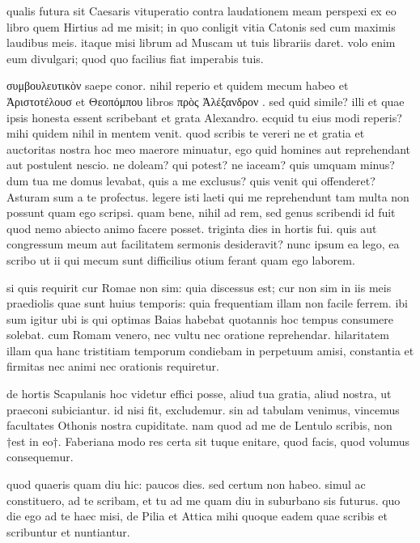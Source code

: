 


 qualis futura sit Caesaris vituperatio contra laudationem meam perspexi ex eo libro quem Hirtius ad me misit; in quo conligit vitia Catonis sed cum maximis laudibus meis. itaque misi librum ad Muscam ut tuis librariis daret. volo enim eum divulgari; quod quo facilius fiat imperabis tuis.

 συμβουλευτικὸν saepe conor. nihil reperio et quidem mecum habeo et Ἀριστοτέλουσ et Θεοπόμπου libros πρὸς Ἀλέξανδρον . sed quid simile? illi et quae ipsis honesta essent scribebant et grata Alexandro. ecquid tu eius modi reperis? mihi quidem nihil in mentem venit. quod scribis te vereri ne et gratia et auctoritas nostra hoc meo maerore minuatur, ego quid homines aut reprehendant aut postulent nescio. ne doleam? qui potest? ne iaceam? quis umquam minus? dum tua me domus levabat, quis a me exclusus? quis venit qui offenderet? Asturam sum a te profectus. legere isti laeti qui me reprehendunt tam multa non possunt quam ego scripsi. quam bene, nihil ad rem, sed genus scribendi id fuit quod nemo abiecto animo facere posset. triginta dies in hortis fui. quis aut congressum meum aut facilitatem sermonis desideravit? nunc ipsum ea lego, ea scribo ut ii qui mecum sunt difficilius otium ferant quam ego laborem.

 si quis requirit cur Romae non sim: quia discessus est; cur non sim in iis meis praediolis quae sunt huius temporis: quia frequentiam illam non facile ferrem. ibi sum igitur ubi is qui optimas Baias habebat quotannis hoc tempus consumere solebat. cum Romam venero, nec vultu nec oratione reprehendar. hilaritatem illam qua hanc tristitiam temporum condiebam in perpetuum amisi, constantia et firmitas nec animi nec orationis requiretur.

 de hortis Scapulanis hoc videtur effici posse, aliud tua gratia, aliud nostra, ut praeconi subiciantur. id nisi fit, excludemur. sin ad tabulam venimus, vincemus facultates Othonis nostra cupiditate. nam quod ad me de Lentulo scribis, non †est in eo†. Faberiana modo res certa sit tuque enitare, quod facis, quod volumus consequemur.

 quod quaeris quam diu hic: paucos dies. sed certum non habeo. simul ac constituero, ad te scribam, et tu ad me quam diu in suburbano sis futurus. quo die ego ad te haec misi, de Pilia et Attica mihi quoque eadem quae scribis et scribuntur et nuntiantur.
